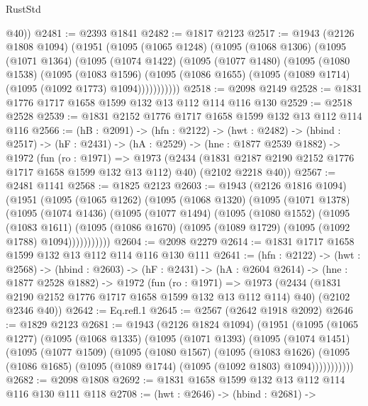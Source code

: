 \begin{lexlean}{RustStd}
\begin{coremodule}
{\begin{coremodule}
        @40))
@2481 := @2393 @1841
@2482 := @1817 @2123
@2517 := @1943
    (@2126 @1808 @1094)
    (@1951
      (@1095
        (@1065 @1248)
        (@1095
          (@1068 @1306)
          (@1095
            (@1071 @1364)
            (@1095
              (@1074 @1422)
              (@1095
                (@1077 @1480)
                (@1095
                  (@1080 @1538)
                  (@1095
                    (@1083 @1596)
                    (@1095 (@1086 @1655) (@1095 (@1089 @1714) (@1095 (@1092 @1773) @1094)))))))))))
@2518 := @2098 @2149
@2528 := @1831 @1776 @1717 @1658 @1599 @132 @13 @112 @114 @116 @130
@2529 := @2518 @2528
@2539 := @1831 @2152 @1776 @1717 @1658 @1599 @132 @13 @112 @114 @116
@2566 := (hB : @2091) ->
  (hfn : @2122) ->
  (hwt : @2482) ->
  (hbind : @2517) ->
  (hF : @2431) ->
  (hA : @2529) ->
  (hne : @1877 @2539 @1882) ->
  @1972
    (fun (ro : @1971) =>
    @1973
      (@2434 (@1831 @2187 @2190 @2152 @1776 @1717 @1658 @1599 @132 @13 @112) @40)
      (@2102 @2218 @40))
@2567 := @2481 @1141
@2568 := @1825 @2123
@2603 := @1943
    (@2126 @1816 @1094)
    (@1951
      (@1095
        (@1065 @1262)
        (@1095
          (@1068 @1320)
          (@1095
            (@1071 @1378)
            (@1095
              (@1074 @1436)
              (@1095
                (@1077 @1494)
                (@1095
                  (@1080 @1552)
                  (@1095
                    (@1083 @1611)
                    (@1095 (@1086 @1670) (@1095 (@1089 @1729) (@1095 (@1092 @1788) @1094)))))))))))
@2604 := @2098 @2279
@2614 := @1831 @1717 @1658 @1599 @132 @13 @112 @114 @116 @130 @111
@2641 := (hfn : @2122) ->
  (hwt : @2568) ->
  (hbind : @2603) ->
  (hF : @2431) ->
  (hA : @2604 @2614) ->
  (hne : @1877 @2528 @1882) ->
  @1972
    (fun (ro : @1971) =>
    @1973
      (@2434 (@1831 @2190 @2152 @1776 @1717 @1658 @1599 @132 @13 @112 @114) @40)
      (@2102 @2346 @40))
@2642 := Eq.refl.{1}
@2645 := @2567 (@2642 @1918 @2092)
@2646 := @1829 @2123
@2681 := @1943
    (@2126 @1824 @1094)
    (@1951
      (@1095
        (@1065 @1277)
        (@1095
          (@1068 @1335)
          (@1095
            (@1071 @1393)
            (@1095
              (@1074 @1451)
              (@1095
                (@1077 @1509)
                (@1095
                  (@1080 @1567)
                  (@1095
                    (@1083 @1626)
                    (@1095 (@1086 @1685) (@1095 (@1089 @1744) (@1095 (@1092 @1803) @1094)))))))))))
@2682 := @2098 @1808
@2692 := @1831 @1658 @1599 @132 @13 @112 @114 @116 @130 @111 @118
@2708 := (hwt : @2646) ->
  (hbind : @2681) ->

\end{coremodule}}
\end{coremodule}
\end{lexlean}
